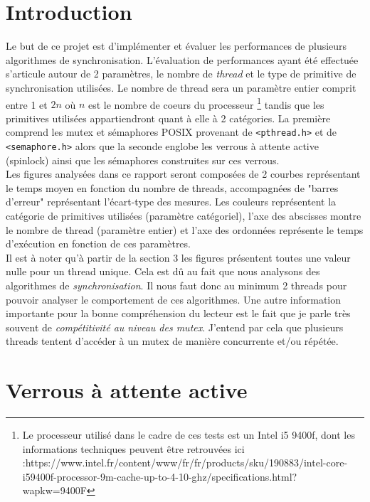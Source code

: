 \newpage

\section{Introduction}

Le but de ce projet est d'implémenter et évaluer les performances de plusieurs algorithmes de synchronisation.
L'évaluation de performances ayant été effectuée s'articule autour de 2 paramètres, le nombre de \textit{thread} et le type de primitive de synchronisation utilisées.
Le nombre de thread sera un paramètre entier comprit entre 1 et $2n$ où $n$ est le nombre de coeurs du processeur \footnote{Le processeur utilisé dans le cadre de ces tests est un Intel i5 9400f, dont les informations techniques peuvent être retrouvées ici :https://www.intel.fr/content/www/fr/fr/products/sku/190883/intel-core-i59400f-processor-9m-cache-up-to-4-10-ghz/specifications.html?wapkw=9400F } tandis que les primitives utilisées appartiendront quant à elle à 2 catégories. La première comprend les mutex et sémaphores POSIX provenant de \texttt{<pthread.h>} et de \texttt{<semaphore.h>} alors que la seconde englobe les verrous à attente active (spinlock) ainsi que les sémaphores construites sur ces verrous.\\ 

\noindent Les figures analysées dans ce rapport seront composées de 2 courbes représentant le temps moyen en fonction du nombre de threads, accompagnées de "barres d'erreur" représentant l'écart-type des mesures.
Les couleurs représentent la catégorie de primitives utilisées (paramètre catégoriel), l'axe des abscisses montre le nombre de thread (paramètre entier) et l'axe des ordonnées représente le temps d'exécution en fonction de ces paramètres. \\

\noindent Il est à noter qu'à partir de la section 3 les figures présentent toutes une valeur nulle pour un thread unique. Cela est dû au fait que nous analysons des algorithmes de \textit{synchronisation}.
Il nous faut donc au minimum 2 threads pour pouvoir analyser le comportement de ces algorithmes. Une autre information importante pour la bonne compréhension du lecteur est le fait que je parle très souvent de \textit{compétitivité au niveau des mutex}. J'entend par cela que plusieurs threads tentent d'accéder à un mutex de manière concurrente et/ou répétée.

\section{Verrous à attente active}

